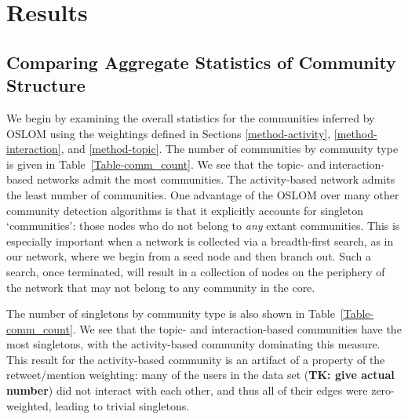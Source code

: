 \section{Results}

\subsection{Comparing Aggregate Statistics of Community Structure}

We begin by examining the overall statistics for the communities inferred by OSLOM using the weightings defined in Sections \ref{method-activity}, \ref{method-interaction}, and \ref{method-topic}. The number of communities by community type is given in Table~\ref{Table-comm_count}. We see that the topic- and interaction-based networks admit the most communities. The activity-based network admits the least number of communities.  One advantage of the OSLOM over many other community detection algorithms is that it explicitly accounts for singleton `communities': those nodes who do not belong to \emph{any} extant communities. This is especially important when a network is collected via a breadth-first search, as in our network, where we begin from a seed node and then branch out. Such a search, once terminated, will result in a collection of nodes on the periphery of the network that may not belong to any community in the core.


The number of singletons by community type is also shown in Table~\ref{Table-comm_count}. We see that the topic- and interaction-based communities have the most singletons, with the activity-based community dominating this measure. This result for the activity-based community is an artifact of a property of the retweet/mention weighting: many of the users in the data set (\textbf{TK: give actual number}) did not interact with each other, and thus all of their edges were zero-weighted, leading to trivial singletons.

